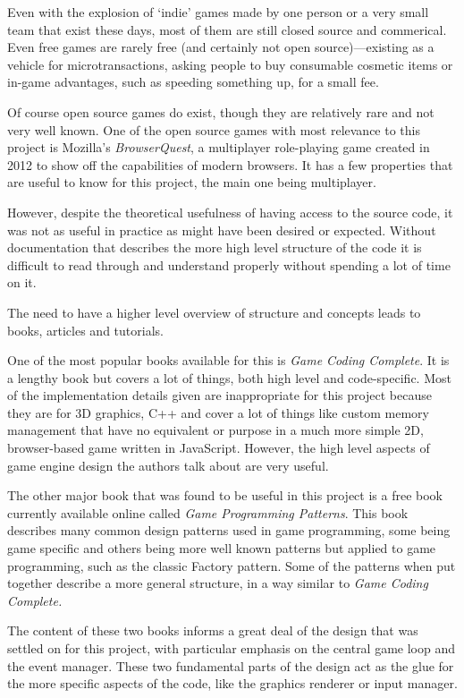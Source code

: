 Even with the explosion of `indie' games made by one person or a very small team that exist these days, most of them are still closed source and commerical. Even free games are rarely free (and certainly not open source)---existing as a vehicle for microtransactions, asking people to buy consumable cosmetic items or in-game advantages, such as speeding something up, for a small fee.

Of course open source games do exist, though they are relatively rare and not very well known. One of the open source games with most relevance to this project is Mozilla's \textit{BrowserQuest}\cite{citeulike:13139186, citeulike:13139189, citeulike:13139194}, a multiplayer role-playing game created in 2012 to show off the capabilities of modern browsers. It has a few properties that are useful to know for this project, the main one being multiplayer.

However, despite the theoretical usefulness of having access to the source code, it was not as useful in practice as might have been desired or expected. Without documentation that describes the more high level structure of the code it is difficult to read through and understand properly without spending a lot of time on it.

The need to have a higher level overview of structure and concepts leads to books, articles and tutorials.

One of the most popular books available for this is \textit{Game Coding Complete}\cite{citeulike:12394552}. It is a lengthy book but covers a lot of things, both high level and code-specific. Most of the implementation details given are inappropriate for this project because they are for 3D graphics, C++ and cover a lot of things like custom memory management that have no equivalent or purpose in a much more simple 2D, browser-based game written in JavaScript. However, the high level aspects of game engine design the authors talk about are very useful.

The other major book that was found to be useful in this project is a free book currently available online called \textit{Game Programming Patterns}\cite{citeulike:13049596}. This book describes many common design patterns used in game programming, some being game specific and others being more well known patterns but applied to game programming, such as the classic Factory pattern. Some of the patterns when put together describe a more general structure, in a way similar to \textit{Game Coding Complete.}

The content of these two books informs a great deal of the design that was settled on for this project, with particular emphasis on the central game loop and the event manager. These two fundamental parts of the design act as the glue for the more specific aspects of the code, like the graphics renderer or input manager.

